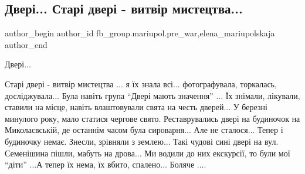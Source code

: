  
 
 
 
 

\subsection{Двері... Старі двері - витвір мистецтва...}
\label{sec:16_01_2023.fb.fb_group.mariupol.pre_war.1.dver___star__dver___}
 
\ifcmt
 author_begin
   author_id fb_group.mariupol.pre_war,elena_mariupolskaja
 author_end
\fi

Двері...

Старі двері - витвір мистецтва ... я їх знала
всі... фотографувала, торкалась, досліджувала... Була навіть група \enquote{Двері мають
значення} ... Їх знімали, лікували, ставили на місце, навіть влаштовували
свята на честь дверей... У березні минулого року, мало статися чергове свято.
Реставрувались двері на будиночок на Миколаєвській, де останнім часом була
сироварня... Але не сталося... Тепер і будиночку немає. Знесли, зрівняли з
землею... Такі чудові сині двері на вул. Семенішина пішли, мабуть на дрова... Ми
водили до них екскурсії, то були мої \enquote{діти} ...А тепер їх нема, їх
вбито, спалено... Боляче ....

